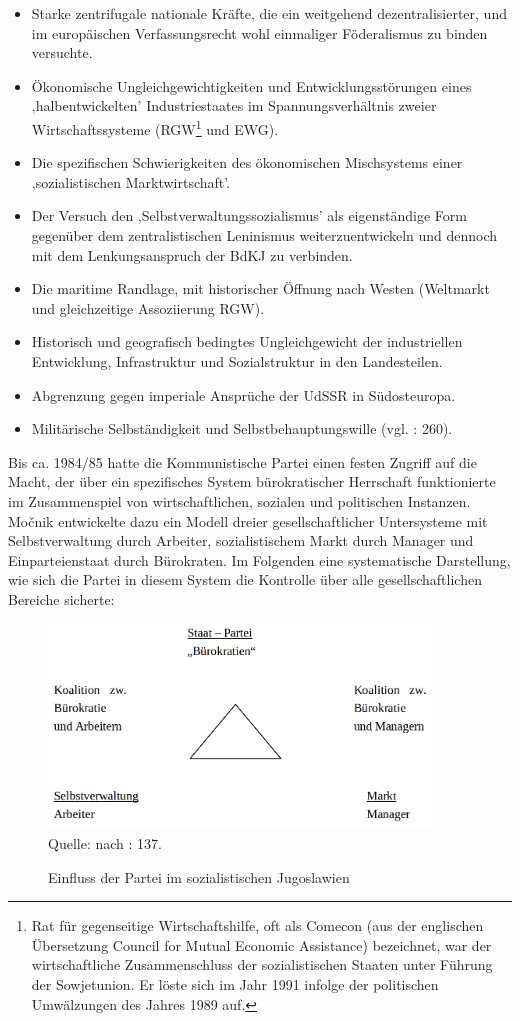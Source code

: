\begin{itemize}
\item Starke zentrifugale nationale Kräfte, die ein weitgehend dezentralisierter, und im europäischen Verfassungsrecht wohl einmaliger Föderalismus zu binden versuchte.
\item Ökonomische Ungleichgewichtigkeiten und Entwicklungsstörungen eines ‚halbentwickelten’ Industriestaates im Spannungsverhältnis zweier Wirtschaftssysteme (RGW\footnote{Rat für gegenseitige Wirtschaftshilfe, oft als Comecon (aus der englischen Übersetzung Council for Mutual Economic Assistance) bezeichnet, war der wirtschaftliche Zusammenschluss der sozialistischen Staaten unter Führung der Sowjetunion. Er löste sich im Jahr 1991 infolge der politischen Umwälzungen des Jahres 1989 auf.} und EWG).
\item Die spezifischen Schwierigkeiten des ökonomischen Mischsystems einer ‚sozialistischen Marktwirtschaft’.
\item Der Versuch den ‚Selbstverwaltungssozialismus’ als eigenständige Form gegenüber dem zentralistischen Leninismus weiterzuentwickeln und dennoch mit dem Lenkungsanspruch der BdKJ zu verbinden.
\item Die maritime Randlage, mit historischer Öffnung nach Westen (Weltmarkt und gleichzeitige Assoziierung RGW).
\item Historisch und geografisch bedingtes Ungleichgewicht der industriellen Entwicklung, Infrastruktur und Sozialstruktur in den Landesteilen.
\item Abgrenzung gegen imperiale Ansprüche der UdSSR in Südosteuropa.
\item Militärische Selbständigkeit und Selbstbehauptungswille (vgl. \cite{roggemann} : 260).
\end{itemize}
Bis ca. 1984/85 hatte die Kommunistische Partei einen festen Zugriff auf die Macht, der über ein spezifisches System bürokratischer Herrschaft funktionierte im Zusammenspiel von wirtschaftlichen, sozialen und politischen Instanzen. Močnik entwickelte dazu ein Modell dreier gesellschaftlicher Untersysteme mit Selbstverwaltung durch Arbeiter, sozialistischem Markt durch Manager und Einparteienstaat durch Bürokraten. Im Folgenden eine systematische Darstellung, wie sich die Partei in diesem System die Kontrolle über alle gesellschaftlichen Bereiche sicherte:
\begin{figure}[H]
\setlength\belowcaptionskip{10pt}
 \caption{Einfluss der Partei im sozialistischen Jugoslawien}
  \centering
  \includegraphics[width=4in]{Material/Parteienbuerokratie}\\
\vspace{0,5cm}
Quelle: nach \cite{mocnik} : 137.
\end{figure}

